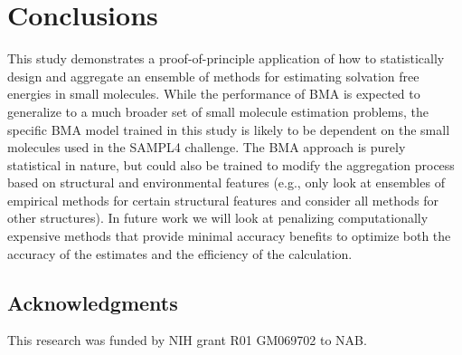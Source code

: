 \documentclass[journal=jpcbfk, manuscript=article]{achemso}
\newcommand{\+}[1]{\ensuremath{\mathbf{#1}}}
\begin{document}
\section{Conclusions}
This study demonstrates a proof-of-principle application of how to statistically design and aggregate an ensemble of methods for estimating solvation free energies in small molecules.
While the performance of BMA is expected to generalize to a much broader set of small molecule estimation problems, the specific BMA model trained in this study is likely to be dependent on the small molecules used in the SAMPL4 challenge.
The BMA approach is purely statistical in nature, but could also be trained to modify the aggregation process based on structural and environmental features (e.g., only look at ensembles of empirical methods for certain structural features and consider all methods for other structures).
In future work we will look at penalizing computationally expensive methods that provide minimal accuracy benefits to optimize both the accuracy of the estimates and the efficiency of the calculation.

\subsection*{Acknowledgments}
This research was funded by NIH grant R01 GM069702 to NAB.


\end{document}
